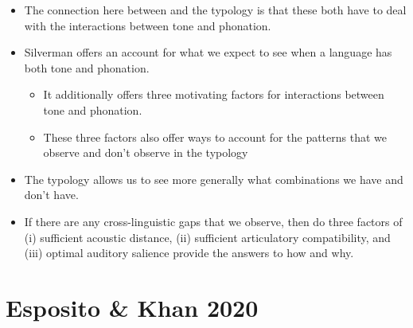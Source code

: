 \begin{itemize}
    \item The connection here between \citet{silvermanLaryngealComplexityOtomanguean1997} and the typology is that these both have to deal with the interactions between tone and phonation. 
    \item Silverman offers an account for what we expect to see when a language has both tone and phonation. 
    \begin{itemize}
        \item It additionally offers three motivating factors for interactions between tone and phonation.
        \item These three factors also offer ways to account for the patterns that we observe and don't observe in the typology
    \end{itemize}
    \item The typology allows us to see more generally what combinations we have and don't have.
    \item If there are any cross-linguistic gaps that we observe, then do  three factors of (i) sufficient acoustic distance, (ii) sufficient articulatory compatibility, and (iii) optimal auditory salience provide the answers to how and why.
\end{itemize}

\section{Esposito \& Khan 2020} \label{sec:EspositoKhan}

